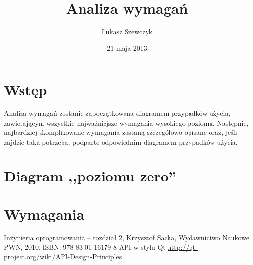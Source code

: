 \documentclass[11pt,twoside,a4paper,final]{article}
\begin{document}
\date{21 maja 2013}
\title{Analiza wymagań}

\author{Łukasz Szewczyk}

\maketitle

\section{Wstęp}
Analiza wymagań zostanie zapoczątkowana diagramem przypadków użycia, zawierającym wszystkie najważniejsze wymagania wysokiego poziomu. Następnie, najbardziej skomplikowane wymagania zostaną szczegółowo opisane oraz, jeśli zajdzie taka potrzeba, podparte odpowiednim diagramem przypadków użycia.

\section{Diagram ,,poziomu zero''}

\section{Wymagania}


\begin{thebibliography}{}
Inżynieria oprogramowania -- rozdział 2, Krzysztof Sacha, Wydawnictwo Naukowe PWN, 2010, ISBN: 978-83-01-16179-8
API w stylu Qt \url{http://qt-project.org/wiki/API-Design-Principles}
\end{thebibliography}
\end{document}
